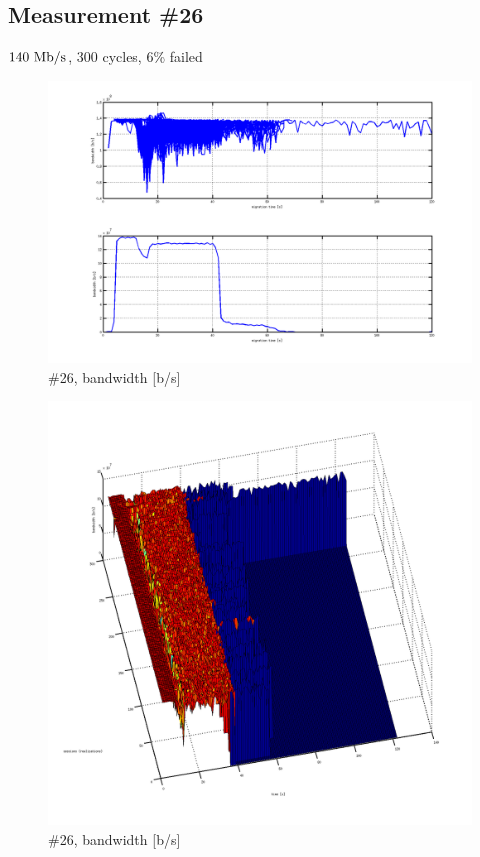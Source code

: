 \subsection{Measurement \#26}
$140~\mathrm{Mb/s}$, $300$ cycles, 6\% failed
\begin{figure}[htb]
	\begin{center}
	\includegraphics[width=\textwidth]{results-269-all.png}
	\end{center}
	\caption[]{\#26, bandwidth [b/s]}
	\label{img:results-269-all.png}
\end{figure}
\begin{figure}[htb]
	\begin{center}
	\includegraphics[width=\textwidth]{results-269-3d.png}
	\end{center}
	\caption[]{\#26, bandwidth [b/s]}
	\label{img:results-269-3d.png}
\end{figure}
